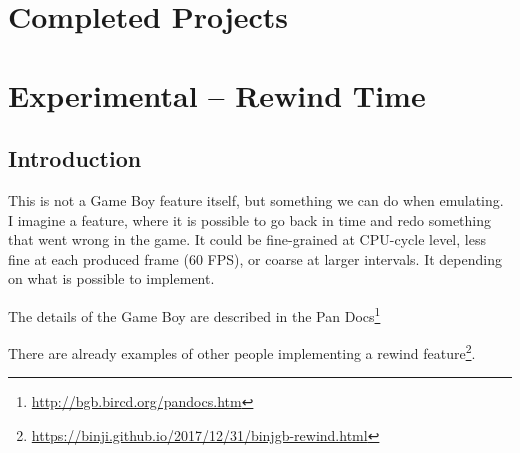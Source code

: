\documentclass[11pt]{report} %
\begin{document}
\chapter*{Completed Projects}
\newpage

\chapter*{Experimental -- Rewind Time}
\section*{Introduction}
This is not a Game Boy feature itself, but something we can do when emulating. I imagine a feature, where it is possible to go back in time and redo something that went wrong in the game. It could be fine-grained at CPU-cycle level, less fine at each produced frame (60 FPS), or coarse at larger intervals. It depending on what is possible to implement.

The details of the Game Boy are described in the Pan Docs\footnote{\url{http://bgb.bircd.org/pandocs.htm}}

There are already examples of other people implementing a rewind feature\footnote{\url{https://binji.github.io/2017/12/31/binjgb-rewind.html}}.
\end{document}
